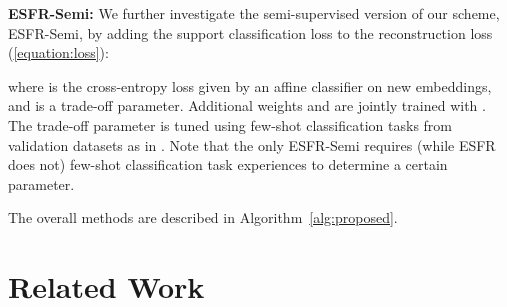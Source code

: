 \documentclass{article}
\begin{document}
\textbf{ESFR-Semi:}
We further investigate the semi-supervised version of our scheme, ESFR-Semi, by adding the support classification loss to the reconstruction loss (\ref{equation:loss}):

where  is the cross-entropy loss given by an affine classifier on new embeddings, and  is a trade-off parameter.
Additional weights  and  are jointly trained with .
The trade-off parameter  is tuned using few-shot classification tasks from validation datasets as in \citet{LaplacianShot}.
Note that the only ESFR-Semi requires (while ESFR does not) few-shot classification task experiences to determine a certain parameter.


The overall methods are described in Algorithm~\ref{alg:proposed}.  \section{Related Work}
\end{document}
